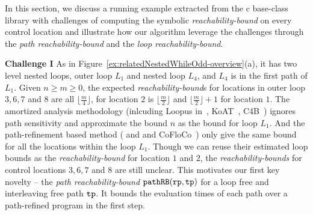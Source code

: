 In this section, we discuss a running example extracted from the c base-class library with
challenges of computing the symbolic
\emph{reachability-bound} on
every control location and illustrate how our algorithm leverage the challenges through the \emph{path reachability-bound} and the \emph{loop reachability-bound}.


\textbf{Challenge I}
As in Figure~\ref{ex:relatedNestedWhileOdd-overview}(a), it has two level nested loops, outer loop $L_1$ and nested loop $L_4$, and $L_4$ is in the first path of $L_1$. Given $n \geq m \geq 0$,
the expected \emph{reachability-bound}s for locations in outer loop $3, 6, 7$ and $8$ are all $\lfloor\frac{m}{4}\rfloor$,
for location $2$ is $\lfloor\frac{m}{2}\rfloor$ and $\lfloor\frac{m}{2}\rfloor + 1$ for location $1$.
The amortized analysis methodology (inlcuding Loopus in~\cite{SinnZV17}, KoAT~\cite{BrockschmidtEFFG14,FalkeKS12,FalkeKS11}, C4B~\cite{CarbonneauxHS15}) ignores path sensitivity and approximate the bound $n$ as the bound for loop $L_1$. 
And the path-refinement based method (\cite{GulwaniZ10} and \cite{GulwaniJK09} and CoFloCo~\cite{Montoya17,Flores-Montoya16,Flores-MontoyaH14}) only give the same bound for all the locations within the loop $L_1$. 
Though we can reuse their estimated loop bounds as the \emph{reachability-bound} for location $1$ and $2$,
the \emph{reachability-bounds} for control locations $3, 6, 7$ and $8$ are still unclear.
%
This motivates our first key novelty -- the \emph{path reachability-bound} $\mathtt{pathRB}(\mathtt{rp}, \mathtt{tp})$ for a loop free and interleaving free path $\mathtt{tp}$.
It bounds the evaluation times of each path over a path-refined program in the first step.

